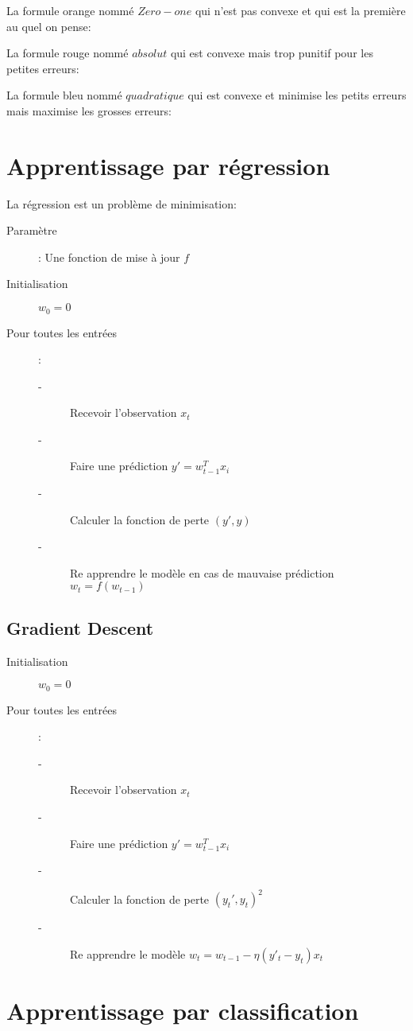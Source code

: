La formule orange nommé $Zero-one$ qui n'est pas convexe et qui est la première au quel on pense:

La formule rouge nommé $absolut$ qui est convexe mais trop punitif pour les petites erreurs:

La formule bleu nommé $quadratique$ qui est convexe et minimise les petits erreurs mais maximise les grosses erreurs:

\pagebreak
\section{Apprentissage par régression}

La régression est un problème de minimisation:\\

\begin{description}
\item[Paramètre]: Une fonction de mise à jour $f$
\item[Initialisation] $w_0 = 0$
\item[Pour toutes les entrées]:\begin{description}
\item[-] Recevoir l'observation $x_t$
\item[-] Faire une prédiction $y' = w_{t-1}^T x_i$
\item[-] Calculer la fonction de perte $(y',y)$
\item[-] Re apprendre le modèle en cas de mauvaise prédiction $w_t = f(w_{t-1})$
\end{description}
\end{description}

\subsection{Gradient Descent}

\begin{description}
\item[Initialisation] $w_0 = 0$
\item[Pour toutes les entrées]:\begin{description}
\item[-] Recevoir l'observation $x_t$
\item[-] Faire une prédiction $y' = w_{t-1}^T x_i$
\item[-] Calculer la fonction de perte $(y_t',y_t)^2$
\item[-] Re apprendre le modèle $w_t = w_{t-1} - \eta(y'_t-y_t) x_t$
\end{description}
\end{description}



\pagebreak
\section{Apprentissage par classification}

\pagebreak

